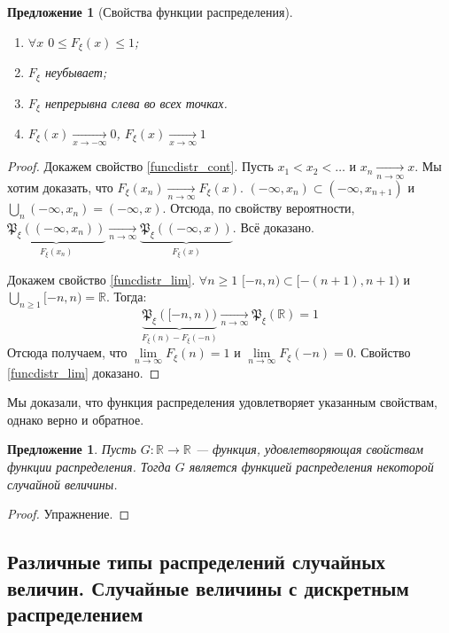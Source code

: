 \documentclass[11pt,openany,a4paper]{scrartcl}
\theoremstyle{plain}
\newtheorem{proposition}[theorem]{Предложение}
\theoremstyle{definition}
\newcommand\mb{\mathbb}
\newcommand\real{\mb R}
\newcommand{\underto}[1]{\xrightarrow[#1]{}}
\newcommand{\distr}{\mathfrak P_\xi}
\newcommand{\funcdistr}{F_\xi}
\begin{document}
\begin{proposition}[Свойства функции распределения]
    \begin{enumerate}
        \item $\forall x$ $0\leqslant \funcdistr(x) \leqslant 1$;
        \item $\funcdistr$ неубывает;
        \item\label{funcdistr_cont} $\funcdistr$ непрерывна слева во всех точках.
        \item\label{funcdistr_lim} $\funcdistr(x) \underto{x \to -\infty} 0$,
        $\funcdistr(x) \underto{x \to \infty} 1$
    \end{enumerate}
\end{proposition}
\begin{proof}
    Докажем свойство \ref{funcdistr_cont}.
    Пусть $x_1 < x_2 < \ldots$ и $x_n \underto{n \to \infty} x$.
    Мы хотим доказать, что $\funcdistr(x_n) \underto{n \to \infty} \funcdistr(x)$.
    $(-\infty, x_n) \subset (-\infty, x_{n+1})$ и $\bigcup\limits_n(-\infty, x_n)
    = (-\infty, x)$. Отсюда, по свойству вероятности,
    $\underbrace{\distr((-\infty, x_n))}_{\funcdistr(x_n)}
    \underto{n \to \infty} \underbrace{\distr((-\infty, x))}_{\funcdistr(x)}$.
    Всё доказано.
    
    Докажем свойство \ref{funcdistr_lim}.
    $\forall n \geqslant 1$ $[-n, n) \subset [-(n+1), n+1)$ и
    $\bigcup\limits_{n \geqslant 1}[-n, n) = \real$. Тогда:
    $$
    \underbrace{\distr([-n, n))}_{\funcdistr(n) - \funcdistr(-n)}
    \underto{n \to \infty} \distr(\real) = 1
    $$
    Отсюда получаем, что $\lim\limits_{n \to \infty} \funcdistr(n) = 1$
    и $\lim\limits_{n \to \infty} \funcdistr(-n) = 0$. Свойство \ref{funcdistr_lim}
    доказано.
\end{proof}

Мы доказали, что функция распределения удовлетворяет указанным свойствам, однако
верно и обратное.

\begin{proposition}
    Пусть $G: \real \to \real$ — функция, удовлетворяющая свойствам функции
    распределения. Тогда $G$ является функцией распределения некоторой случайной 
    величины.
\end{proposition}
\begin{proof}
    Упражнение.
\end{proof}

\subsection{Различные типы распределений случайных величин. Случайные величины
с дискретным распределением}
\end{document}
